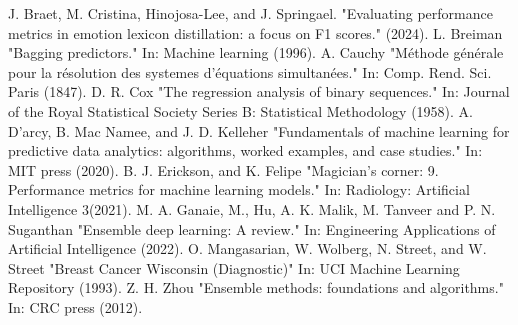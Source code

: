 \documentclass[10pt, conference]{IEEEtran}
\begin{document}
\begin{thebibliography}{00}
     J. Braet, M. Cristina, Hinojosa-Lee, and J. Springael. "Evaluating performance metrics in emotion lexicon distillation: a focus on F1 scores." (2024).
     L. Breiman "Bagging predictors." In: Machine learning (1996).
     A. Cauchy "Méthode générale pour la résolution des systemes d’équations simultanées." In: Comp. Rend. Sci. Paris (1847).
     D. R. Cox "The regression analysis of binary sequences." In: Journal of the Royal Statistical Society Series B: Statistical Methodology (1958).
     A. D'arcy, B. Mac Namee, and J. D. Kelleher "Fundamentals of machine learning for predictive data analytics: algorithms, worked examples, and case studies." In: MIT press (2020).
     B. J. Erickson, and K. Felipe "Magician’s corner: 9. Performance metrics for machine learning models." In: Radiology: Artificial Intelligence 3(2021).
     M. A. Ganaie, M., Hu, A. K. Malik, M. Tanveer and P. N. Suganthan "Ensemble deep learning: A review." In: Engineering Applications of Artificial Intelligence (2022).
     O. Mangasarian, W. Wolberg, N. Street, and W. Street "Breast Cancer Wisconsin (Diagnostic)" In: UCI Machine Learning Repository (1993).
     Z. H. Zhou "Ensemble methods: foundations and algorithms." In: CRC press (2012).
\end{thebibliography}

\printglossary[type=\acronymtype]
\end{document}
